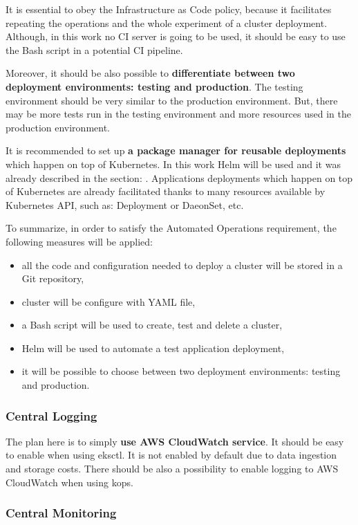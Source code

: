 It is essential to obey the Infrastructure as Code policy, because it facilitates repeating the operations and the whole experiment of a cluster deployment. Although, in this work no CI server is going to be used, it should be easy to use the Bash script in a potential CI pipeline.

Moreover, it should be also possible to \textbf{differentiate between two deployment environments: testing and production}. The testing environment should be very similar to the production environment. But, there may be more tests run in the testing environment and more resources used in the production environment.

It is recommended to set up \textbf{a package manager for reusable deployments} which happen on top of Kubernetes\cite{gruntwork-howto-blog}. In this work Helm will be used and it was already described in the section: . Applications deployments which happen on top of Kubernetes are already facilitated thanks to many resources available by Kubernetes API, such as: Deployment\cite{k8s-resources-depl} or DaeonSet\cite{k8s-resources-ds}, etc.

To summarize, in order to satisfy the Automated Operations requirement, the following measures will be applied:
\begin{itemize}
\item all the code and configuration needed to deploy a cluster will be stored in a Git repository,
\item cluster will be configure with YAML file,
\item a Bash script will be used to create, test and delete a cluster,
\item Helm will be used to automate a test application deployment,
\item it will be possible to choose between two deployment environments: testing and production.
\end{itemize}


\subsubsection{Central Logging}

The plan here is to simply \textbf{use AWS CloudWatch service}. It should be easy to enable when using eksctl. It is not enabled by default due to data ingestion and storage costs\cite{eksctl-cw}. There should be also a possibility to enable logging to AWS CloudWatch when using kops.

\subsubsection{Central Monitoring}


